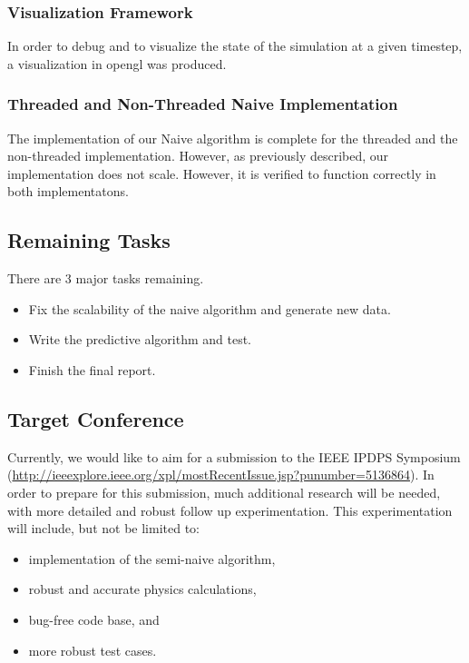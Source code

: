 \documentclass[conference]{IEEEtran}
\begin{document}
\subsubsection{Visualization Framework}
In order to debug and to visualize the state of the simulation at a given timestep, a visualization in opengl was produced.
\subsubsection{Threaded and Non-Threaded Naive Implementation}
The implementation of our Naive algorithm is complete for the threaded and the non-threaded implementation.  However, as previously described, our implementation does not scale.  However, it is verified to function
correctly in both implementatons.

\subsection{Remaining Tasks}
There are 3 major tasks remaining.
\begin{itemize}
\item Fix the scalability of the naive algorithm and generate new data.
\item Write the predictive algorithm and test.
\item Finish the final report.
\end{itemize}

\subsection{Target Conference}
Currently, we would like to aim for a submission to the IEEE IPDPS Symposium (\url{http://ieeexplore.ieee.org/xpl/mostRecentIssue.jsp?punumber=5136864}).  In order to prepare for this submission, much additional research will be needed, with more detailed and robust follow up experimentation.  This experimentation will include, but not be limited to:
\begin{itemize}
\item implementation of the semi-naive algorithm,
\item robust and accurate physics calculations,
\item bug-free code base, and
\item more robust test cases.
\end{itemize}
\end{document}
